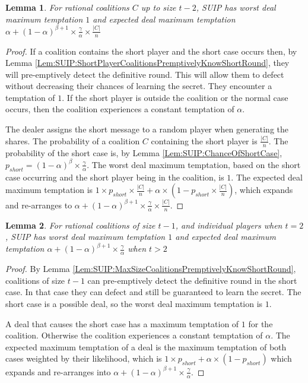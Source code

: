 \documentclass{dalcsthesis}
\newtheorem{lemma}{Lemma}
\begin{document}
\begin{lemma} For rational coalitions $C$ up to size $t-2$, SUIP has worst deal maximum temptation $1$ and expected deal maximum temptation $\alpha + (1-\alpha)^{\beta+1} \times \frac{\gamma}{\alpha} \times \frac{|C|}{n}$ \label{Lem:SUIP:AllCoalitionsTempted} \end{lemma}
\begin{proof}
If a coalition contains the short player and the short case occurs then, by Lemma \ref{Lem:SUIP:ShortPlayerCoalitionsPremptivelyKnowShortRound}, they will pre-emptively detect the definitive round. This will allow them to defect without decreasing their chances of learning the secret. They encounter a temptation of $1$. If the short player is outside the coalition or the normal case occurs, then the coalition experiences a constant temptation of $\alpha$.

The dealer assigns the short message to a random player when generating the shares. The probability of a coalition $C$ containing the short player is $\frac{|C|}{n}$. The probability of the short case is, by Lemma \ref{Lem:SUIP:ChanceOfShortCase}, $p_{short} = (1-\alpha)^\beta \times \frac{\gamma}{\alpha}$. The worst deal maximum temptation, based on the short case occurring and the short player being in the coalition, is $1$. The expected deal maximum temptation is $1 \times p_{short} \times \frac{|C|}{n} + \alpha \times (1 - p_{short} \times \frac{|C|}{n})$, which expands and re-arranges to $\alpha + (1-\alpha)^{\beta+1} \times \frac{\gamma}{\alpha} \times \frac{|C|}{n}$.
\end{proof}

\begin{lemma} For rational coalitions of size $t-1$, and individual players when $t=2$, SUIP has worst deal maximum temptation $1$ and expected deal maximum temptation $\alpha + (1-\alpha)^{\beta+1} \times \frac{\gamma}{\alpha}$ when $t > 2$ \label{Lem:SUIP:MaxSizeCoalitionsTemptedMore} \end{lemma}
\begin{proof}
By Lemma \ref{Lem:SUIP:MaxSizeCoalitionsPremptivelyKnowShortRound}, coalitions of size $t-1$ can pre-emptively detect the definitive round in the short case. In that case they can defect and still be guaranteed to learn the secret. The short case is a possible deal, so the worst deal maximum temptation is $1$.

A deal that causes the short case has a maximum temptation of $1$ for the coalition. Otherwise the coalition experiences a constant temptation of $\alpha$. The expected maximum temptation of a deal is the maximum temptation of both cases weighted by their likelihood, which is $1 \times p_{short} + \alpha \times (1-p_{short})$ which expands and re-arranges into $\alpha + (1-\alpha)^{\beta+1} \times \frac{\gamma}{\alpha}$.
\end{proof}
\end{document}
